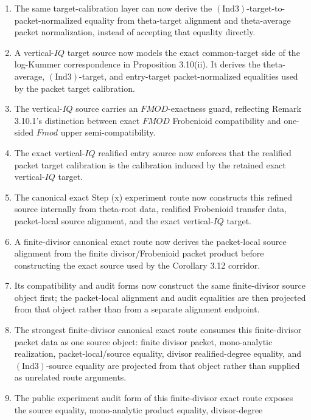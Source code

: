 \documentclass[11pt]{article}
\newcommand{\Ind}{\ensuremath{\mathrm{Ind}}}
\theoremstyle{plain}
\theoremstyle{definition}
\theoremstyle{remark}
\begin{document}
\begin{enumerate}
  normalized log-volume.  The target-calibration constructor derived from this
  source removes the separate entry-target-to-packet-normalized equality.
\item The same target-calibration layer can now derive the
  \((\Ind3)\)-target-to-packet-normalized equality from theta-target alignment
  and theta-average packet normalization, instead of accepting that equality
  directly.
\item A vertical-\(IQ\) target source now models the exact common-target side
  of the log-Kummer correspondence in Proposition 3.10(ii).  It derives the
  theta-average, \((\Ind3)\)-target, and entry-target packet-normalized
  equalities used by the packet target calibration.
\item The vertical-\(IQ\) source carries an \(FMOD\)-exactness guard, reflecting
  Remark 3.10.1's distinction between exact \(FMOD\) Frobenioid
  compatibility and one-sided \(Fmod\) upper semi-compatibility.
\item The exact vertical-\(IQ\) realified entry source now enforces that the
  realified packet target calibration is the calibration induced by the
  retained exact vertical-\(IQ\) target.
\item The canonical exact Step (x) experiment route now constructs this
  refined source internally from theta-root data, realified Frobenioid
  transfer data, packet-local source alignment, and the exact vertical-\(IQ\)
  target.
\item A finite-divisor canonical exact route now derives the packet-local
  source alignment from the finite divisor/Frobenioid packet product before
  constructing the exact source used by the Corollary 3.12 corridor.
\item Its compatibility and audit forms now construct the same finite-divisor
  source object first; the packet-local alignment and audit equalities are
  then projected from that object rather than from a separate alignment
  endpoint.
\item The strongest finite-divisor canonical exact route consumes this
  finite-divisor packet data as one source object: finite divisor packet,
  mono-analytic realization, packet-local/source equality, divisor
  realified-degree equality, and \((\Ind3)\)-source equality are projected
  from that object rather than supplied as unrelated route arguments.
\item The public experiment audit form of this finite-divisor exact route
  exposes the source equality, mono-analytic product equality, divisor-degree

\end{enumerate}
\end{document}
